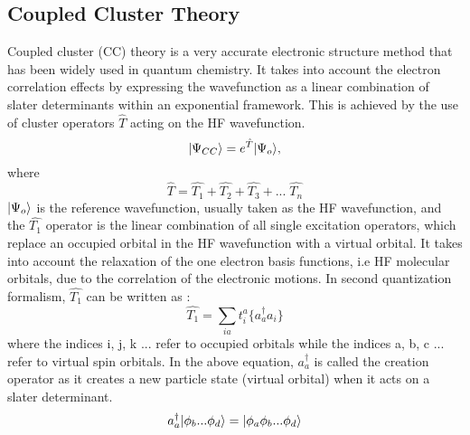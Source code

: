 \subsection{Coupled Cluster Theory} 
Coupled cluster\cite{Crawford00} (CC) theory is a very accurate electronic
structure method that has been widely used in quantum chemistry.
It takes into account the electron correlation effects by expressing the
wavefunction as a linear combination of slater determinants within an
exponential framework. This is achieved by the use of cluster operators $\hat{T}$ 
acting on the HF wavefunction.
\begin{equation}
| \Psi_{CC} \rangle = e^{\hat{T}}| \Psi_{o} \rangle , 
\end{equation}
where
\begin{equation}
 \hat{T} = \hat{T_1} + \hat{T_2} + \hat{T_3} + ... \;\hat {T_n} 
\end{equation}
$| \Psi_{o} \rangle$ is the reference wavefunction, usually taken as the HF
wavefunction, and the $\hat{T_1}$ operator is the linear combination of all single excitation
operators, which replace an occupied orbital in the HF wavefunction with a
virtual orbital. It takes into account the relaxation of the one electron basis
functions, i.e HF molecular orbitals, due to the correlation of the electronic
motions. In second quantization\cite{JorgensenSimons81} formalism, $\hat{T_1}$
can be written as :
\begin{equation}
\hat{T_1} = \sum_{ia}t^a_i\{{a}^\dagger_a a_i\}
\end{equation}
where the indices i, j, k ... refer to occupied orbitals while
the indices a, b, c ... refer to virtual spin orbitals.
In the above equation, ${a}^\dagger_a$ is called the creation operator as it
creates a new particle state (virtual orbital) when it acts on a slater determinant.
\begin{equation}
{a}^\dagger_a| \phi_b...\phi_d \rangle = | \phi_a\phi_b...\phi_d \rangle
\end{equation}
